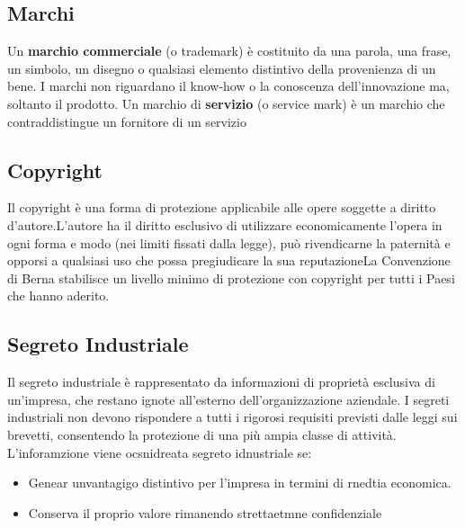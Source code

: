 \documentclass{article}
\begin{document}
\subsection{Marchi}
Un \textbf{marchio commerciale} (o trademark) è costituito da una parola, una frase, un simbolo, un
disegno o qualsiasi elemento distintivo della provenienza di un bene. I marchi non riguardano il
know-how o la conoscenza dell’innovazione ma, soltanto il prodotto.
Un marchio di \textbf{servizio} (o service mark) è un marchio
che contraddistingue un fornitore di un servizio

\subsection{Copyright}
Il copyright è una forma di protezione applicabile alle opere soggette a diritto d’autore.L’autore ha il diritto esclusivo di utilizzare economicamente l’opera in ogni forma e modo (nei limiti fissati dalla legge), può rivendicarne la paternità e opporsi a qualsiasi uso che possa pregiudicare la sua reputazioneLa Convenzione di Berna stabilisce un livello minimo di protezione con copyright per tutti i Paesi che hanno aderito.

\subsection{Segreto Industriale }
Il segreto industriale è rappresentato da informazioni di proprietà
esclusiva di un’impresa, che restano ignote all’esterno dell’organizzazione
aziendale.
I segreti industriali non devono rispondere a tutti i rigorosi requisiti previsti
dalle leggi sui brevetti, consentendo la protezione di una più ampia classe
di attività.
L'inforamzione viene ocsnidreata segreto idnustriale se:
\begin{itemize}
	\item Genear unvantagigo distintivo per l'impresa in termini di rnedtia economica.
	\item Conserva il proprio valore rimanendo strettaetmne confidenziale
\end{itemize}
\end{document}
